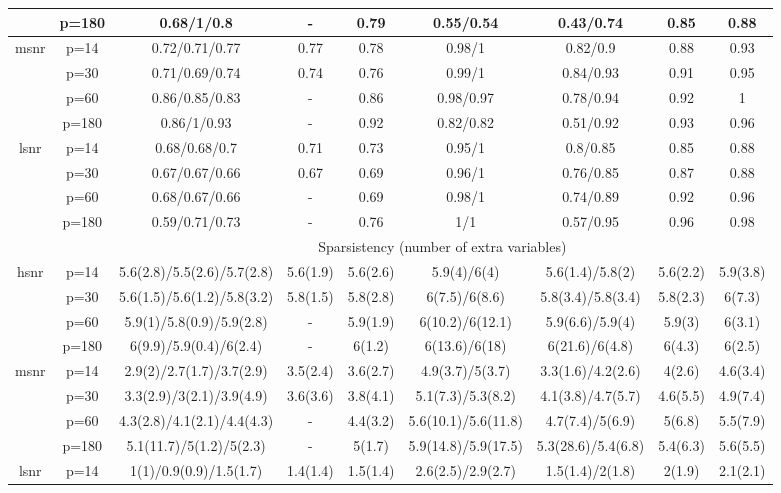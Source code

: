 \begin{table}[ht]
{\begin{tabular}{|c|c|ccccccc|}
   & p=180 & 0.68/1/0.8 & - & 0.79 & 0.55/0.54 & 0.43/0.74 & 0.85 & 0.88 \\ 
  \midrule\multirow{4}[2]{*}{msnr} & p=14 & 0.72/0.71/0.77 & 0.77 & 0.78 & 0.98/1 & 0.82/0.9 & 0.88 & 0.93 \\ 
   & p=30 & 0.71/0.69/0.74 & 0.74 & 0.76 & 0.99/1 & 0.84/0.93 & 0.91 & 0.95 \\ 
   & p=60 & 0.86/0.85/0.83 & - & 0.86 & 0.98/0.97 & 0.78/0.94 & 0.92 & 1 \\ 
   & p=180 & 0.86/1/0.93 & - & 0.92 & 0.82/0.82 & 0.51/0.92 & 0.93 & 0.96 \\ 
  \midrule\multirow{4}[2]{*}{lsnr} & p=14 & 0.68/0.68/0.7 & 0.71 & 0.73 & 0.95/1 & 0.8/0.85 & 0.85 & 0.88 \\ 
   & p=30 & 0.67/0.67/0.66 & 0.67 & 0.69 & 0.96/1 & 0.76/0.85 & 0.87 & 0.88 \\ 
   & p=60 & 0.68/0.67/0.66 & - & 0.69 & 0.98/1 & 0.74/0.89 & 0.92 & 0.96 \\ 
   & p=180 & 0.59/0.71/0.73 & - & 0.76 & 1/1 & 0.57/0.95 & 0.96 & 0.98 \\ 
   \midrule 
 \multicolumn{1}{|c}{} &       & \multicolumn{7}{c|}{Sparsistency (number of extra variables)} \\
\midrule\multirow{4}[2]{*}{hsnr} & p=14 & 5.6(2.8)/5.5(2.6)/5.7(2.8) & 5.6(1.9) & 5.6(2.6) & 5.9(4)/6(4) & 5.6(1.4)/5.8(2) & 5.6(2.2) & 5.9(3.8) \\ 
   & p=30 & 5.6(1.5)/5.6(1.2)/5.8(3.2) & 5.8(1.5) & 5.8(2.8) & 6(7.5)/6(8.6) & 5.8(3.4)/5.8(3.4) & 5.8(2.3) & 6(7.3) \\ 
   & p=60 & 5.9(1)/5.8(0.9)/5.9(2.8) & - & 5.9(1.9) & 6(10.2)/6(12.1) & 5.9(6.6)/5.9(4) & 5.9(3) & 6(3.1) \\ 
   & p=180 & 6(9.9)/5.9(0.4)/6(2.4) & - & 6(1.2) & 6(13.6)/6(18) & 6(21.6)/6(4.8) & 6(4.3) & 6(2.5) \\ 
  \midrule\multirow{4}[2]{*}{msnr} & p=14 & 2.9(2)/2.7(1.7)/3.7(2.9) & 3.5(2.4) & 3.6(2.7) & 4.9(3.7)/5(3.7) & 3.3(1.6)/4.2(2.6) & 4(2.6) & 4.6(3.4) \\ 
   & p=30 & 3.3(2.9)/3(2.1)/3.9(4.9) & 3.6(3.6) & 3.8(4.1) & 5.1(7.3)/5.3(8.2) & 4.1(3.8)/4.7(5.7) & 4.6(5.5) & 4.9(7.4) \\ 
   & p=60 & 4.3(2.8)/4.1(2.1)/4.4(4.3) & - & 4.4(3.2) & 5.6(10.1)/5.6(11.8) & 4.7(7.4)/5(6.9) & 5(6.8) & 5.5(7.9) \\ 
   & p=180 & 5.1(11.7)/5(1.2)/5(2.3) & - & 5(1.7) & 5.9(14.8)/5.9(17.5) & 5.3(28.6)/5.4(6.8) & 5.4(6.3) & 5.6(5.5) \\ 
  \midrule\multirow{4}[2]{*}{lsnr} & p=14 & 1(1)/0.9(0.9)/1.5(1.7) & 1.4(1.4) & 1.5(1.4) & 2.6(2.5)/2.9(2.7) & 1.5(1.4)/2(1.8) & 2(1.9) & 2.1(2.1) \\ 

\end{tabular}}
\end{table}

